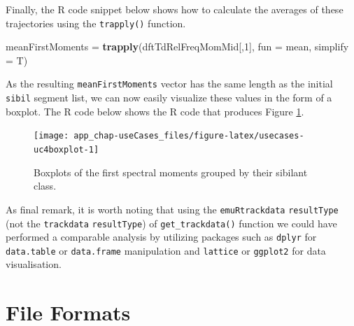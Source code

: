 \documentclass[]{book}
\newenvironment{Shaded}{\begin{snugshade}}{\end{snugshade}}
\newcommand{\DataTypeTok}[1]{\textcolor[rgb]{0.13,0.29,0.53}{#1}}
\newcommand{\DecValTok}[1]{\textcolor[rgb]{0.00,0.00,0.81}{#1}}
\newcommand{\KeywordTok}[1]{\textcolor[rgb]{0.13,0.29,0.53}{\textbf{#1}}}
\newcommand{\NormalTok}[1]{#1}
\newcommand{\OperatorTok}[1]{\textcolor[rgb]{0.81,0.36,0.00}{\textbf{#1}}}
\newcommand{\StringTok}[1]{\textcolor[rgb]{0.31,0.60,0.02}{#1}}
\theoremstyle{definition}
\theoremstyle{definition}
\theoremstyle{definition}
\theoremstyle{remark}
\begin{document}
Finally, the R code snippet below shows how to calculate the averages of
these trajectories using the \texttt{trapply()} function.

\begin{Shaded}
\begin{Highlighting}[]
\NormalTok{meanFirstMoments =}\StringTok{ }\KeywordTok{trapply}\NormalTok{(dftTdRelFreqMomMid[,}\DecValTok{1}\NormalTok{],}
                           \DataTypeTok{fun =}\NormalTok{ mean,}
                           \DataTypeTok{simplify =}\NormalTok{ T)}
\end{Highlighting}
\end{Shaded}

As the resulting \texttt{meanFirstMoments} vector has the same length as
the initial \texttt{sibil} segment list, we can now easily visualize
these values in the form of a boxplot. The R code below shows the R code
that produces Figure \ref{fig:usecases-uc4boxplot}.

\begin{Shaded}
\end{Shaded}

\begin{figure}

{\centering \texttt{[image: app\_chap-useCases\_files/figure-latex/usecases-uc4boxplot-1]} 

}

\caption{Boxplots of the first spectral moments grouped by their sibilant class.}\label{fig:usecases-uc4boxplot}
\end{figure}

As final remark, it is worth noting that using the
\texttt{emuRtrackdata} \texttt{resultType} (not the \texttt{trackdata}
\texttt{resultType}) of \texttt{get\_trackdata()} function we could have
performed a comparable analysis by utilizing packages such as
\texttt{dplyr} for \texttt{data.table} or \texttt{data.frame}
manipulation and \texttt{lattice} or \texttt{ggplot2} for data
visualisation.

\hypertarget{app-chap:fileFormats}{%
\chapter{File Formats}\label{app-chap:fileFormats}}
\end{document}
